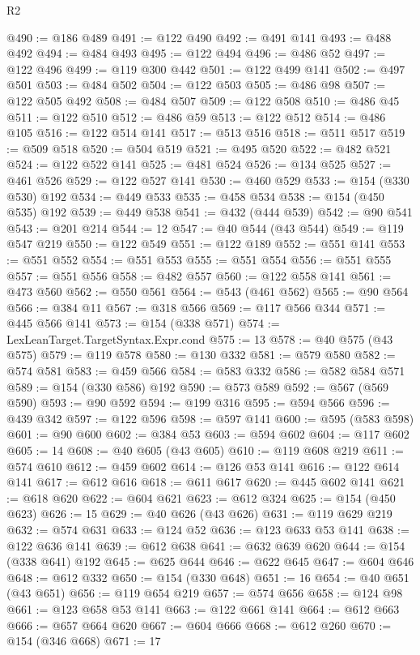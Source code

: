 \begin{lexlean}{R2}
\begin{coremodule}
{{{{{{{{{{{{{{{{{{{{{{{{{{{{{{{{{{{{{{{{{{{{{{{{{{{{{{{{{{{{{{{{{{{{{{{{{{{{{{{{{{{{{{{{{{{{@490 := @186 @489
@491 := @122 @490
@492 := @491 @141
@493 := @488 @492
@494 := @484 @493
@495 := @122 @494
@496 := @486 @52
@497 := @122 @496
@499 := @119 @300 @442
@501 := @122 @499 @141
@502 := @497 @501
@503 := @484 @502
@504 := @122 @503
@505 := @486 @98
@507 := @122 @505 @492
@508 := @484 @507
@509 := @122 @508
@510 := @486 @45
@511 := @122 @510
@512 := @486 @59
@513 := @122 @512
@514 := @486 @105
@516 := @122 @514 @141
@517 := @513 @516
@518 := @511 @517
@519 := @509 @518
@520 := @504 @519
@521 := @495 @520
@522 := @482 @521
@524 := @122 @522 @141
@525 := @481 @524
@526 := @134 @525
@527 := @461 @526
@529 := @122 @527 @141
@530 := @460 @529
@533 := @154 (@330 @530) @192
@534 := @449 @533
@535 := @458 @534
@538 := @154 (@450 @535) @192
@539 := @449 @538
@541 := @432 (@444 @539)
@542 := @90 @541
@543 := @201 @214
@544 := 12
@547 := @40 @544 (@43 @544)
@549 := @119 @547 @219
@550 := @122 @549
@551 := @122 @189
@552 := @551 @141
@553 := @551 @552
@554 := @551 @553
@555 := @551 @554
@556 := @551 @555
@557 := @551 @556
@558 := @482 @557
@560 := @122 @558 @141
@561 := @473 @560
@562 := @550 @561
@564 := @543 (@461 @562)
@565 := @90 @564
@566 := @384 @11
@567 := @318 @566
@569 := @117 @566 @344
@571 := @445 @566 @141
@573 := @154 (@338 @571)
@574 := LexLeanTarget.TargetSyntax.Expr.cond
@575 := 13
@578 := @40 @575 (@43 @575)
@579 := @119 @578
@580 := @130 @332
@581 := @579 @580
@582 := @574 @581
@583 := @459 @566
@584 := @583 @332
@586 := @582 @584 @571
@589 := @154 (@330 @586) @192
@590 := @573 @589
@592 := @567 (@569 @590)
@593 := @90 @592
@594 := @199 @316
@595 := @594 @566
@596 := @439 @342
@597 := @122 @596
@598 := @597 @141
@600 := @595 (@583 @598)
@601 := @90 @600
@602 := @384 @53
@603 := @594 @602
@604 := @117 @602
@605 := 14
@608 := @40 @605 (@43 @605)
@610 := @119 @608 @219
@611 := @574 @610
@612 := @459 @602
@614 := @126 @53 @141
@616 := @122 @614 @141
@617 := @612 @616
@618 := @611 @617
@620 := @445 @602 @141
@621 := @618 @620
@622 := @604 @621
@623 := @612 @324
@625 := @154 (@450 @623)
@626 := 15
@629 := @40 @626 (@43 @626)
@631 := @119 @629 @219
@632 := @574 @631
@633 := @124 @52
@636 := @123 @633 @53 @141
@638 := @122 @636 @141
@639 := @612 @638
@641 := @632 @639 @620
@644 := @154 (@338 @641) @192
@645 := @625 @644
@646 := @622 @645
@647 := @604 @646
@648 := @612 @332
@650 := @154 (@330 @648)
@651 := 16
@654 := @40 @651 (@43 @651)
@656 := @119 @654 @219
@657 := @574 @656
@658 := @124 @98
@661 := @123 @658 @53 @141
@663 := @122 @661 @141
@664 := @612 @663
@666 := @657 @664 @620
@667 := @604 @666
@668 := @612 @260
@670 := @154 (@346 @668)
@671 := 17
}}}}}}}}}}}}}}}}}}}}}}}}}}}}}}}}}}}}}}}}}}}}}}}}}}}}}}}}}}}}}}}}}}}}}}}}}}}}}}}}}}}}}}}}}}}}
\end{coremodule}
\end{lexlean}
